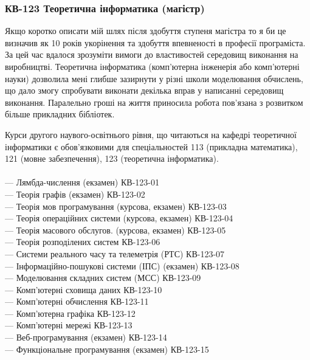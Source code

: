 \subsubsection*{КВ-123 Теоретична інформатика (магістр)}

Якщо коротко описати мій шлях після здобуття ступеня магістра
то я би це визначив як 10 років укорінення та здобуття впевненості
в професії програміста. За цей час вдалося зрозуміти вимоги до
властивостей середовищ виконання на виробництві. Теоретична
інформатика (комп'ютерна інженерія або комп'ютерні науки) дозволила
мені глибше зазирнути у різні школи моделювання обчислень, що дало
змогу спробувати виконати декілька вправ у написанні середовищ
виконання. Паралельно гроші на життя приносила робота пов'язана
з розвитком більше прикладних бібліотек.

Курси другого наувого-освітнього рівня, що читаються на кафедрі
теоретичної інформатики є обов'язковими для спеціальностей 113 (прикладна
математика), 121 (мовне забезпечення), 123 (теоретична інформатика).
\\
\\
\noindent--- Лямбда-числення (екзамен) КВ-123-01\\
--- Теорія графів (екзамен) КВ-123-02\\
--- Теорія мов програмування (курсова, екзамен) КВ-123-03\\
--- Теорія операційних системи (курсова, екзамен) КВ-123-04\\
--- Теорія масового обслугов. (курсова, екзамен) КВ-123-05\\
--- Теорія розподілених систем КВ-123-06\\
--- Системи реального часу та телеметрія (РТС) КВ-123-07\\
--- Інформаційно-пошукові системи (ІПС) (екзамен) КВ-123-08\\
--- Моделювання складних систем (МСС) КВ-123-09\\
--- Комп'ютерні сховища даних КВ-123-10\\
--- Комп'ютерні обчислення КВ-123-11\\
--- Комп'ютерна графіка КВ-123-12\\
--- Комп'ютерні мережі КВ-123-13\\
--- Веб-програмування (екзамен) КВ-123-14\\
--- Функціональне програмування (екзамен) КВ-123-15\\

